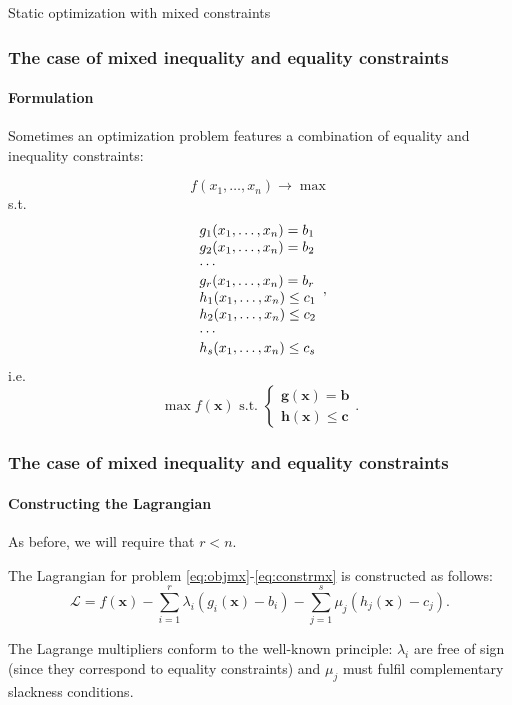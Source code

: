 \documentclass[10pt]{beamer}
\theoremstyle{definition}
\begin{document}
\begin{section}{Static optimization with mixed constraints}\label{sec:mixed}

\begin{frame}[fragile]
\frametitle{The case of mixed inequality and equality constraints}
\framesubtitle{Formulation}
Sometimes an optimization problem features a combination of  equality and inequality constraints:

\begin{equation}
f(x_1,\ldots,x_n)\rightarrow \max 
\label{eq:objmx}
\end{equation}
s.t.
\begin{equation}
\begin{array}{l l l}
g_1(x_1,\ldots,x_n) = b_1\\
g_2(x_1,\ldots,x_n) = b_2\\
\cdots \\
g_r(x_1,\ldots,x_n) = b_r\\
h_1(x_1,\ldots,x_n) \leq c_1\\
h_2(x_1,\ldots,x_n) \leq c_2\\
\cdots \\
h_s(x_1,\ldots,x_n) \leq c_s\\
\end{array},
\label{eq:constrmx}
\end{equation}
i.e. \begin{equation*}
\max f(\mathbf{x}) \text{ s.t. } \left\{ \begin{array}{l}
\mathbf{g}(\mathbf{x}) = \mathbf{b}\\
\mathbf{h}(\mathbf{x})\leq \mathbf{c}
\end{array} \right. .
\end{equation*}
\end{frame}

\begin{frame}[fragile]
\frametitle{The case of mixed inequality and equality constraints}
\framesubtitle{Constructing the Lagrangian}
As before, we will require that $ r<n $. \bigskip

The Lagrangian for problem \eqref{eq:objmx}-\eqref{eq:constrmx} is constructed as follows:
\[ \mathcal{L} = f(\mathbf{x}) - \sum_{i=1}^{r}\lambda_i (g_i(\mathbf{x})-b_i) - \sum_{j=1}^{s}\mu_j (h_j(\mathbf{x})-c_j). \]

The Lagrange multipliers conform to the well-known principle: $ \lambda_i $ are free of sign (since they correspond to equality constraints) and $ \mu_j $ must fulfil complementary slackness conditions.
\end{frame}


\end{section}
\end{document}
